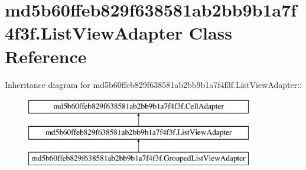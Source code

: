\hypertarget{classmd5b60ffeb829f638581ab2bb9b1a7f4f3f_1_1_list_view_adapter}{
\section{md5b60ffeb829f638581ab2bb9b1a7f4f3f.ListViewAdapter Class Reference}
\label{classmd5b60ffeb829f638581ab2bb9b1a7f4f3f_1_1_list_view_adapter}
}
Inheritance diagram for md5b60ffeb829f638581ab2bb9b1a7f4f3f.ListViewAdapter::\begin{figure}[H]
\begin{center}
\leavevmode
\includegraphics[height=3cm]{classmd5b60ffeb829f638581ab2bb9b1a7f4f3f_1_1_list_view_adapter}
\end{center}
\end{figure}
